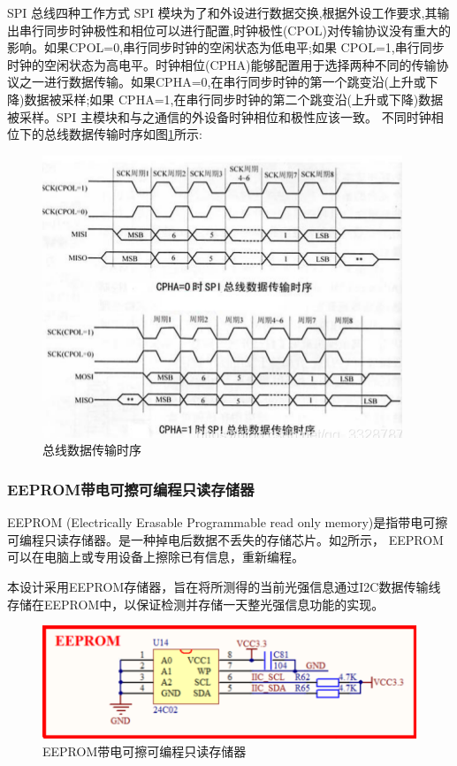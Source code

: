 \documentclass[UTF8]{ctexart}
\begin{document}
SPI 总线四种工作方式 SPI 模块为了和外设进行数据交换,根据外设工作要求,其输出串行同步时钟极性和相位可以进行配置,时钟极性(CPOL)对传输协议没有重大的影响。如果CPOL=0,串行同步时钟的空闲状态为低电平;如果 CPOL=1,串行同步时钟的空闲状态为高电平。时钟相位(CPHA)能够配置用于选择两种不同的传输协议之一进行数据传输。如果CPHA=0,在串行同步时钟的第一个跳变沿(上升或下降)数据被采样;如果 CPHA=1,在串行同步时钟的第二个跳变沿(上升或下降)数据被采样。SPI 主模块和与之通信的外设备时钟相位和极性应该一致。
不同时钟相位下的总线数据传输时序如图\ref{c}所示:
\begin{figure}[h]
	\centering
	\includegraphics[scale = 0.65]{4}
	\caption{总线数据传输时序}
	\label{c}
\end{figure}
\subsubsection{EEPROM带电可擦可编程只读存储器}
EEPROM (Electrically Erasable Programmable read only memory)是指带电可擦可编程只读存储器。是一种掉电后数据不丢失的存储芯片。如\ref{d}所示， EEPROM 可以在电脑上或专用设备上擦除已有信息，重新编程。

本设计采用EEPROM存储器，旨在将所测得的当前光强信息通过I2C数据传输线存储在EEPROM中，以保证检测并存储一天整光强信息功能的实现。

\begin{figure}[h]
	\centering
	\includegraphics[scale = 0.9]{5}
	\caption{EEPROM带电可擦可编程只读存储器}
	\label{d}
\end{figure}
\end{document}
